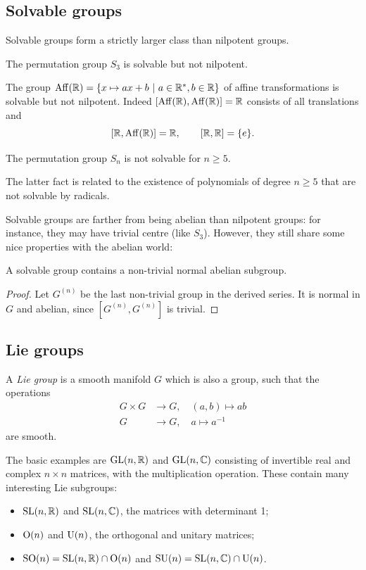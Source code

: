 \subsection{Solvable groups}
Solvable groups form a strictly larger class than nilpotent groups.
\begin{ex}
The permutation group $S_3$ is solvable but not nilpotent.
\end{ex}
\begin{ex}
The group ${\rm Aff}(\mathbb{R})=\{x\mapsto ax+b\ |\ a\in\mathbb{R}^*, b\in\mathbb{R}\}$ of affine transformations is solvable but not nilpotent. Indeed $[{\rm Aff}(\mathbb{R}), {\rm Aff}(\mathbb{R})] = \mathbb{R}$ consists of all translations and
$$[\mathbb{R}, {\rm Aff}(\mathbb{R})] = \mathbb{R}, \qquad [\mathbb{R}, \mathbb{R}] = \{e\}.$$
\end{ex}

\begin{ex} The permutation group $S_n$ is not solvable for $n\geqslant 5$.
\end{ex}
The latter fact is related to the existence of polynomials of degree $n\geqslant 5$ that are not solvable by radicals. 

Solvable groups are farther from being abelian than nilpotent groups: for instance, they may have trivial centre (like $S_3$). However, they still share some  nice properties with the abelian world:

\begin{prop} \label{solvable:normal:prop}
A solvable group contains a non-trivial normal abelian subgroup.
\end{prop}
\begin{proof}
Let $G^{(n)}$ be the last non-trivial group in the derived series. It is normal in $G$ and abelian, since $[G^{(n)}, G^{(n)}]$ is trivial.
\end{proof}

\subsection{Lie groups}
A \emph{Lie group} is a smooth manifold $G$ which is also a group, such that the operations 
\begin{align*}
G\times G & \to G, \quad (a,b) \mapsto ab \\
G & \to G, \quad a \mapsto a^{-1}
\end{align*}
are smooth. 

\begin{example}
The basic examples are ${\rm GL}(n,\mathbb{R})$ and ${\rm GL}(n,\mathbb{C})$ consisting of invertible real and complex $n\times n$ matrices, with the multiplication operation. These contain many interesting Lie subgroups:
\begin{itemize}
\item ${\rm SL}(n,\mathbb{R})$ and ${\rm SL}(n,\mathbb{C})$, the matrices with determinant 1;
\item ${\rm O}(n)$ and ${\rm U}(n)$, the orthogonal and unitary matrices;
\item ${\rm SO}(n) = {\rm SL}(n,\mathbb{R}) \cap {\rm O}(n)$ and ${\rm SU}(n) = {\rm SL}(n,\mathbb{C})\cap {\rm U}(n)$.
\end{itemize}
\end{example}

